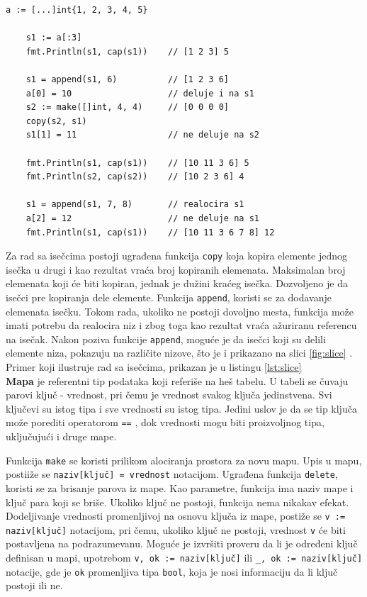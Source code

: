 \documentclass[12pt,oneside]{memoir}
\begin{document}
\begin{center}
\begin{lstlisting}[caption=Primer koji demonstrira rad sa isečcima, label={lst:slice},  backgroundcolor=\color{background}]
	a := [...]int{1, 2, 3, 4, 5}
	
	s1 := a[:3] 				
	fmt.Println(s1, cap(s1))	// [1 2 3] 5
	
	s1 = append(s1, 6) 			// [1 2 3 6]
	a[0] = 10					// deluje i na s1
	s2 := make([]int, 4, 4)		// [0 0 0 0] 
	copy(s2, s1)
	s1[1] = 11					// ne deluje na s2
	
	fmt.Println(s1, cap(s1)) 	// [10 11 3 6] 5
	fmt.Println(s2, cap(s2)) 	// [10 2 3 6] 4
	
	s1 = append(s1, 7, 8)		// realocira s1
	a[2] = 12					// ne deluje na s1
	fmt.Println(s1, cap(s1))	// [10 11 3 6 7 8] 12
\end{lstlisting}
\end{center}

Za rad sa isečcima postoji ugrađena funkcija \texttt{copy} koja kopira elemente jednog isečka u drugi i kao rezultat vraća broj kopiranih elemenata. Maksimalan broj elemenata koji će biti kopiran, jednak je dužini kraćeg isečka. Dozvoljeno je da isečci pre kopiranja dele elemente. Funkcija \texttt{append}, koristi se za dodavanje elemenata isečku. Tokom rada, ukoliko ne postoji dovoljno mesta, funkcija može imati potrebu da realocira niz i zbog toga kao rezultat vraća ažuriranu referencu na isečak. Nakon poziva funkcije \texttt{append}, moguće je da isečci koji su delili elemente niza, pokazuju na različite nizove, što je i prikazano na slici \ref{fig:slice} \cite{bookGoProg}. Primer koji ilustruje rad sa isečcima, prikazan je u listingu \ref{lst:slice}
\\

\textbf{Mapa} je referentni tip podataka koji referiše na heš tabelu. U tabeli se čuvaju parovi ključ - vrednost, pri čemu je vrednost svakog ključa jedinstvena. Svi ključevi su istog tipa i sve vrednosti su istog tipa. Jedini uslov je da se tip ključa može porediti operatorom \texttt{==} , dok vrednosti mogu biti proizvoljnog tipa, uključujući i druge mape. 

Funkcija \texttt{make} se koristi prilikom alociranja prostora za novu mapu. Upis u mapu, postiiže se \texttt{naziv[ključ] = vrednost} notacijom. Ugrađena funkcija \texttt{delete}, koristi se za brisanje parova iz mape. Kao parametre, funkcija ima naziv mape i ključ para koji se briše. Ukoliko ključ ne postoji, funkcija nema nikakav efekat. Dodeljivanje vrednosti promenljivoj na osnovu ključa iz mape, postiže se \texttt{v := naziv[ključ]} notacijom, pri čemu, ukoliko ključ ne postoji, vrednost \texttt{v} će biti postavljena na podrazumevanu. Moguće je izvršiti proveru da li je određeni ključ definisan u mapi, upotrebom \texttt{v, ok := naziv[ključ]} ili  \texttt{\_, ok := naziv[ključ]} notacije, gde je \texttt{ok} promenljiva tipa \texttt{bool}, koja je nosi informaciju da li ključ postoji ili ne. 
\end{document}
